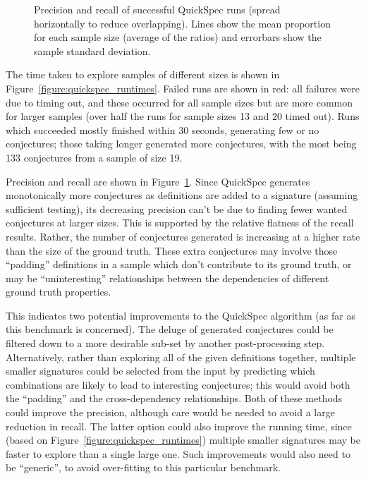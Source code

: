 \begin{figure}
  \centering
  
  \caption{Precision and recall of successful QuickSpec runs (spread
    horizontally to reduce overlapping). Lines show the mean proportion for each
    sample size (average of the ratios) and errorbars show the sample standard
    deviation.}
  \label{figure:quickspec_precRec}
\end{figure}

The time taken to explore samples of different sizes is shown in
Figure~\ref{figure:quickspec_runtimes}. Failed runs are shown in red: all
failures were due to timing out, and these occurred for all sample sizes but are
more common for larger samples (over half the runs for sample sizes 13 and 20
timed out). Runs which succeeded mostly finished within 30 seconds, generating
few or no conjectures; those taking longer generated more conjectures, with the
most being 133 conjectures from a sample of size 19.

Precision and recall are shown in Figure~\ref{figure:quickspec_precRec}.
Since QuickSpec generates monotonically more conjectures as definitions are
added to a signature (assuming sufficient testing), its decreasing precision
can't be due to finding fewer wanted conjectures at larger sizes. This is
supported by the relative flatness of the recall results. Rather, the number of
conjectures generated is increasing at a higher rate than the size of the ground
truth. These extra conjectures may involve those ``padding'' definitions in a
sample which don't contribute to its ground truth, or may be ``uninteresting''
relationships between the dependencies of different ground truth properties.

This indicates two potential improvements to the QuickSpec algorithm (as far as
this benchmark is concerned). The deluge of generated conjectures could be
filtered down to a more desirable sub-set by another post-processing step.
Alternatively, rather than exploring all of the given definitions together,
multiple smaller signatures could be selected from the input by predicting which
combinations are likely to lead to interesting conjectures; this would avoid
both the ``padding'' and the cross-dependency relationships. Both of these
methods could improve the precision, although care would be needed to avoid a
large reduction in recall. The latter option could also improve the running
time, since (based on Figure~\ref{figure:quickspec_runtimes}) multiple smaller
signatures may be faster to explore than a single large one. Such improvements
would also need to be ``generic'', to avoid over-fitting to this particular
benchmark.

